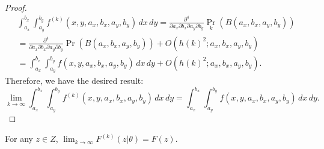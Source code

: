 \begin{proof}
  \begin{align*}
    \displaystyle \int_{a_x}^{b_x} \displaystyle \int_{a_y}^{b_y}
    f^{(k)}(x,y,a_x,b_x,a_y,b_y)\, dx\, dy =
    \frac{\partial^4}{\partial a_x \partial b_x \partial a_y \partial
    b_y} \Pr_k(B(a_x, b_x, a_y, b_y)) \\
    = \frac{\partial^4}{\partial
      a_x \partial b_x \partial a_y \partial b_y} \Pr(B(a_x, b_x, a_y,
    b_y)) +  O(h(k)^2; a_x, b_x, a_y, b_y) \\
    =\displaystyle \int_{a_x}^{b_x} \displaystyle \int_{a_y}^{b_y}
    f(x,y,a_x,b_x,a_y,b_y)\, dx\, dy + O(h(k)^2; a_x, b_x, a_y, b_y).
  \end{align*}
  Therefore, we have the desired result:
  \[
    \lim_{k\to \infty} \displaystyle \int_{a_x}^{b_x} \displaystyle
    \int_{a_y}^{b_y} f^{(k)}(x,y,a_x,b_x,a_y,b_y)\, dx\,dy =
    \displaystyle \int_{a_x}^{b_x} \displaystyle \int_{a_y}^{b_y}
    f(x,y,a_x,b_x,a_y,b_y)\, dx\,dy.
  \]
\end{proof}

\begin{lemma} \label{lem:conv-dist}
  For any $z \in Z$,
  $ \lim_{k \to \infty} F^{(k)}(z | \theta) = F(z).$

\end{lemma}

